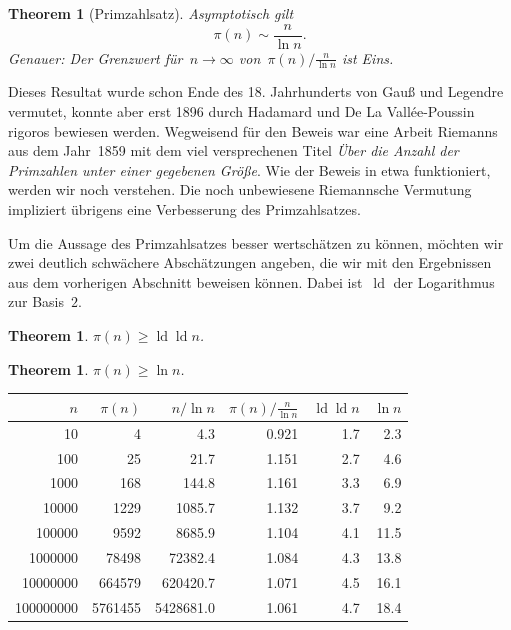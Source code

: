 \documentclass[twoside]{../zirkelblatt1415}
\theoremstyle{definition}
\theoremstyle{plain}
\newtheorem{thm}[defn]{Theorem}
\theoremstyle{remark}
\DeclareMathOperator{\ld}{ld}
\begin{document}
\begin{thm}[Primzahlsatz]\label{thm:primzahlsatz}
Asymptotisch gilt
\[ \pi(n) \sim \frac{n}{\ln n}. \]
Genauer: Der Grenzwert für~$n \to \infty$ von~$\pi(n) / \frac{n}{\ln n}$ ist
Eins.
\end{thm}

Dieses Resultat wurde schon Ende des 18. Jahrhunderts von Gauß und Legendre
vermutet, konnte aber erst 1896 durch Hadamard und De La Vallée-Poussin rigoros
bewiesen werden. Wegweisend für den Beweis war eine Arbeit Riemanns aus dem
Jahr~1859 mit dem viel versprechenen Titel \emph{Über die Anzahl der Primzahlen
unter einer gegebenen Größe}. Wie der Beweis in etwa funktioniert, werden wir
noch verstehen. Die noch unbewiesene Riemannsche Vermutung impliziert übrigens
eine Verbesserung des Primzahlsatzes.

Um die Aussage des Primzahlsatzes besser wertschätzen zu können, möchten wir
zwei deutlich schwächere Abschätzungen angeben, die wir mit den Ergebnissen aus
dem vorherigen Abschnitt beweisen können. Dabei ist~$\ld$ der Logarithmus zur
Basis~$2$.

\begin{thm}\label{thm:pi-schranke1}$\pi(n) \geq \ld \ld n$.\end{thm}
\begin{thm}\label{thm:pi-schranke2}$\pi(n) \geq \ln n$.\end{thm}

\begin{center}
  \begin{tabular}{rrrrrr}
    \toprule
    $n$ & $\pi(n)$ & $n/\ln n$ & $\pi(n)/\frac{n}{\ln n}$ & $\ld\ld n$ & $\ln n$ \\\midrule
    10    & 4    &   4.3     & 0.921     & 1.7 & 2.3 \\
    100   & 25    &  21.7      & 1.151   &    2.7 & 4.6 \\
    1000  & 168    & 144.8     & 1.161   &   3.3 & 6.9 \\
    10000 & 1229   & 1085.7    &  1.132 & 3.7 &  9.2 \\
    100000  &  9592 &    8685.9      & 1.104 & 4.1 &  11.5 \\
    1000000 &      78498 &  72382.4     &  1.084 & 4.3 &  13.8 \\
    10000000 &     664579 & 620420.7    &   1.071 & 4.5 &  16.1 \\
    100000000 &    5761455 & 5428681.0  &     1.061 & 4.7 & 18.4 \\
    \bottomrule
  \end{tabular}
\end{center}
\end{document}
